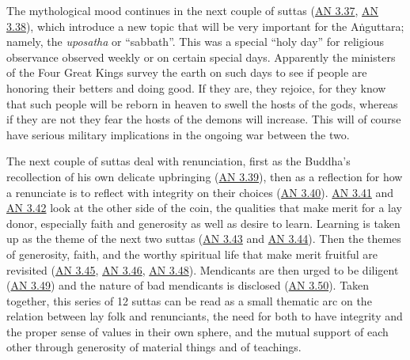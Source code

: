 \documentclass[12pt,openany]{book}%
\begin{document}
The mythological mood continues in the next couple of suttas (\href{https://suttacentral.net/an3.37}{AN 3.37}, \href{https://suttacentral.net/an3.38}{AN 3.38}), which introduce a new topic that will be very important for the \textsanskrit{Aṅguttara}; namely, the \textit{uposatha} or “sabbath”. This was a special “holy day” for religious observance observed weekly or on certain special days. Apparently the ministers of the Four Great Kings survey the earth on such days to see if people are honoring their betters and doing good. If they are, they rejoice, for they know that such people will be reborn in heaven to swell the hosts of the gods, whereas if they are not they fear the hosts of the demons will increase. This will of course have serious military implications in the ongoing war between the two.

The next couple of suttas deal with renunciation, first as the Buddha’s recollection of his own delicate upbringing (\href{https://suttacentral.net/an3.39}{AN 3.39}), then as a reflection for how a renunciate is to reflect with integrity on their choices (\href{https://suttacentral.net/an3.40}{AN 3.40}). \href{https://suttacentral.net/an3.41}{AN 3.41} and \href{https://suttacentral.net/an3.42}{AN 3.42} look at the other side of the coin, the qualities that make merit for a lay donor, especially faith and generosity as well as desire to learn. Learning is taken up as the theme of the next two suttas (\href{https://suttacentral.net/an3.43}{AN 3.43} and \href{https://suttacentral.net/an3.44}{AN 3.44}). Then the themes of generosity, faith, and the worthy spiritual life that make merit fruitful are revisited (\href{https://suttacentral.net/an3.45}{AN 3.45}, \href{https://suttacentral.net/an3.46}{AN 3.46}, \href{https://suttacentral.net/an3.48}{AN 3.48}). Mendicants are then urged to be diligent (\href{https://suttacentral.net/an3.49}{AN 3.49}) and the nature of bad mendicants is disclosed (\href{https://suttacentral.net/an3.50}{AN 3.50}). Taken together, this series of 12 suttas can be read as a small thematic arc on the relation between lay folk and renunciants, the need for both to have integrity and the proper sense of values in their own sphere, and the mutual support of each other through generosity of material things and of teachings.
\end{document}

